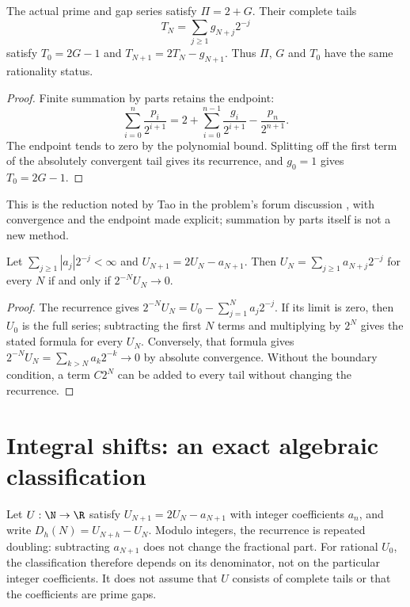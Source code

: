 \documentclass[11pt]{article}
\begin{document}
\begin{theorem}\label{res:infinite}
The actual prime and gap series satisfy $\Pi=2+G$.  Their complete tails
\[
 T_N=\sum_{j\ge1}g_{N+j}2^{-j}
\]
satisfy $T_0=2G-1$ and $T_{N+1}=2T_N-g_{N+1}$.
Thus $\Pi$, $G$ and $T_0$ have the same rationality status.
\end{theorem}
\begin{proof}
Finite summation by parts retains the endpoint:
\[
 \sum_{i=0}^{n}\frac{p_i}{2^{i+1}}
 =2+\sum_{i=0}^{n-1}\frac{g_i}{2^{i+1}}-\frac{p_n}{2^{n+1}}.
\]
The endpoint tends to zero by the polynomial bound.  Splitting off the
first term of the absolutely convergent tail gives its recurrence, and
$g_0=1$ gives $T_0=2G-1$.
\end{proof}
This is the reduction noted by Tao in the problem's forum discussion
\cite[7 October 2025]{erdosproblems251thread}, with convergence and the
endpoint made explicit; summation by parts itself is not a new method.

\begin{lemma}\label{res:true-tail}
Let $\sum_{j\ge1}|a_j|2^{-j}<\infty$ and $U_{N+1}=2U_N-a_{N+1}$.
Then $U_N=\sum_{j\ge1}a_{N+j}2^{-j}$ for every $N$ if and only if
$2^{-N}U_N\to0$.
\end{lemma}
\begin{proof}
The recurrence gives
$2^{-N}U_N=U_0-\sum_{j=1}^{N}a_j2^{-j}$.
If its limit is zero, then $U_0$ is the full series; subtracting the first
$N$ terms and multiplying by $2^N$ gives the stated formula for every
$U_N$.  Conversely, that formula gives
$2^{-N}U_N=\sum_{k>N}a_k2^{-k}\to0$ by absolute convergence.
Without the boundary condition, a term $C2^N$ can be added to every tail
without changing the recurrence.
\end{proof}

\section{Integral shifts: an exact algebraic classification}\label{sec:tail}
Let $U:\N\to\R$ satisfy $U_{N+1}=2U_N-a_{N+1}$ with integer
coefficients $a_n$, and write $D_h(N)=U_{N+h}-U_N$.
Modulo integers, the recurrence is repeated doubling: subtracting
$a_{N+1}$ does not change the fractional part.  For rational $U_0$, the classification
therefore depends on its denominator, not on the particular integer
coefficients.  It does not assume that $U$ consists of complete tails or
that the coefficients are prime gaps.
\end{document}
